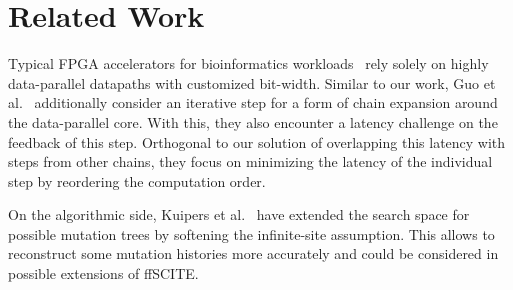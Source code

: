\documentclass[sigconf]{acmart}
\begin{document}
\section{Related Work}

Typical FPGA accelerators for bioinformatics workloads~\cite{yu-kw-03a,zh-ta-07a,ja-la-08a} rely solely on highly data-parallel datapaths with customized bit-width. Similar to our work, Guo et al.~\cite{gu-la-19a} additionally consider an iterative step for a form of chain expansion around the data-parallel core. With this, they also encounter a latency challenge on the feedback of this step. Orthogonal to our solution of overlapping this latency with steps from other chains, they focus on minimizing the latency of the individual step by reordering the computation order.

On the algorithmic side, Kuipers et al.~\cite{ku-ja-17a} have extended the search space for possible mutation trees by softening the infinite-site assumption. This allows to reconstruct some mutation histories more accurately and could be considered in possible extensions of \ac{ffSCITE}.




 
\end{document}
